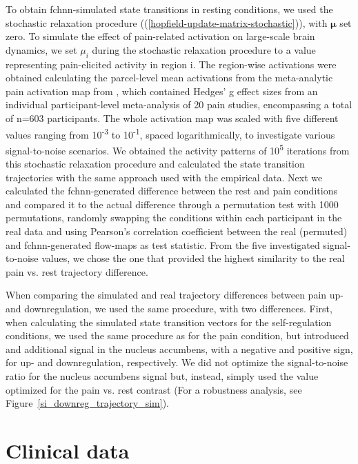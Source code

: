 \documentclass{article}
\begin{document}
To obtain \acrshort{fchnn}-simulated state transitions in resting conditions, we used the stochastic relaxation procedure ((\ref{hopfield-update-matrix-stochastic})), with $\mathbf{\mu}$ set zero.
To simulate the effect of pain-related activation on large-scale brain dynamics, we set $\mu_i$ during the stochastic relaxation procedure to a value representing pain-elicited activity in region i. The region-wise activations were obtained calculating the parcel-level mean activations from the meta-analytic pain activation map from \citep{zunhammer2021meta}, which contained Hedges' g effect sizes from an individual participant-level meta-analysis of 20 pain studies, encompassing a total of n=603 participants. The whole activation map was scaled with five different values ranging from 10\textsuperscript{-3} to 10\textsuperscript{-1}, spaced logarithmically, to investigate various signal-to-noise scenarios.
We obtained the activity patterns of 10\textsuperscript{5} iterations from this stochastic relaxation procedure and calculated the state transition trajectories with the same approach used with the empirical data.
Next we calculated the \acrshort{fchnn}-generated difference between the rest and pain conditions and compared it to the actual difference through a permutation test with 1000 permutations, randomly swapping the conditions within each participant in the real data and using Pearson's correlation coefficient between the real (permuted) and \acrshort{fchnn}-generated flow-maps as test statistic.
From the five investigated signal-to-noise values, we chose the one that provided the highest similarity to the real pain vs. rest trajectory difference.

When comparing the simulated and real trajectory differences between pain up- and downregulation, we used the same procedure, with two differences. First, when calculating the simulated state transition vectors for the self-regulation conditions, we used the same procedure as for the pain condition, but introduced and additional signal in the nucleus accumbens, with a negative and positive sign, for  up- and downregulation, respectively. We did not optimize the signal-to-noise ratio for the nucleus accumbens signal but, instead, simply used the value optimized for the pain vs. rest contrast (For a robustness analysis, see Figure~\ref{si_downreg_trajectory_sim}).

\section{Clinical data}
\end{document}
